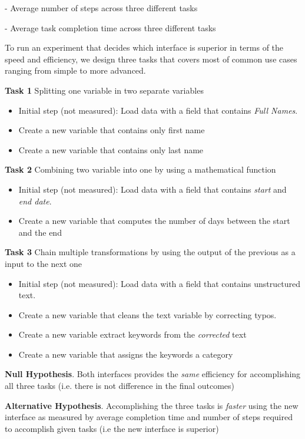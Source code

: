 \documentclass[12pt,letterpaper]{article}
\begin{document}
\hspace{20mm} - Average number of steps across three different tasks 


\hspace{20mm} - Average task completion time across three different tasks

To run an experiment that decides which interface is superior in terms of the speed and efficiency, we design three tasks that covers most of common use cases ranging from simple to more advanced. 

\textbf{Task 1} Splitting one variable in two separate variables
\begin{itemize}
    \item Initial step (not measured): Load data with a field that contains \textit{Full Names}. 
    \item Create a new variable that contains only first name
    \item Create a new variable that contains only last name
\end{itemize}

\textbf{Task 2} Combining two variable into one by using a mathematical function
\begin{itemize}
    \item Initial step (not measured): Load data with a field that contains \textit{start} and \textit{end date}. 
    \item Create a new variable that computes the number of days between the start and the end
\end{itemize}

\textbf{Task 3} Chain multiple transformations by using the output of the previous as a input to the next one
\begin{itemize}
    \item Initial step (not measured): Load data with a field that contains unstructured text. 
    \item Create a new variable that cleans the text variable by correcting typos.
    \item Create a new variable extract keywords from the \textit{corrected} text
    \item Create a new variable that assigns the keywords a category
\end{itemize}


\textbf{Null Hypothesis}. Both interfaces provides the \textit{same} efficiency for accomplishing all three tasks (i.e. there is not difference in the final outcomes)

\textbf{Alternative Hypothesis}. Accomplishing the three tasks is \textit{faster} using the new interface as measured by average completion time and number of steps required to accomplish given tasks (i.e the new interface is superior)
\end{document}
